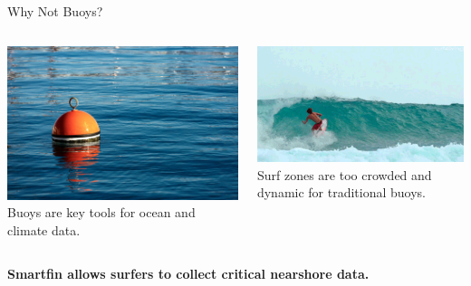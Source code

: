\begin{frame}{Why Not Buoys?}
    \begin{columns}[c]
        \begin{column}{0.5\textwidth}
            \centering
            \includegraphics[width=0.9\linewidth]{images/buoy.jpg}
            \vspace{0.5em}
            {\small Buoys are key tools for ocean and climate data.}
        \end{column}
        \begin{column}{0.5\textwidth}
            \centering
            \includegraphics[width=0.9\linewidth]{images/surfzone.gif}
            \vspace{0.5em}
            {\small Surf zones are too crowded and dynamic for traditional buoys.}
        \end{column}
    \end{columns}
    \vspace{1em}
    \begin{center}
    \textbf{Smartfin allows surfers to collect critical nearshore data.}
    \end{center}
\end{frame}
